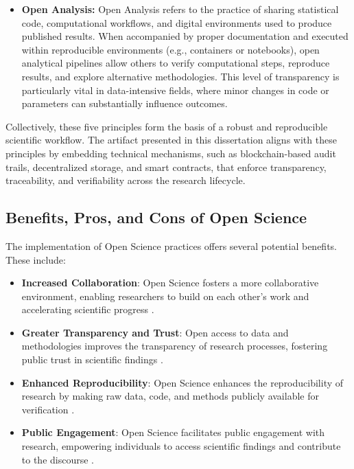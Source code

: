 \documentclass[final]{rc-book-2.14}
\begin{document}
\begin{itemize}
    \item \textbf{Open Analysis:} Open Analysis refers to the practice of sharing statistical code, computational workflows, and digital environments used to produce published results. When accompanied by proper documentation and executed within reproducible environments (e.g., containers or notebooks), open analytical pipelines allow others to verify computational steps, reproduce results, and explore alternative methodologies. This level of transparency is particularly vital in data-intensive fields, where minor changes in code or parameters can substantially influence outcomes.

\end{itemize}

Collectively, these five principles form the basis of a robust and reproducible scientific workflow. The artifact presented in this dissertation aligns with these principles by embedding technical mechanisms, such as blockchain-based audit trails, decentralized storage, and smart contracts, that enforce transparency, traceability, and verifiability across the research lifecycle.


\subsection{Benefits, Pros, and Cons of Open Science}

The implementation of Open Science practices offers several potential benefits. These include:

\begin{itemize}
    \item \textbf{Increased Collaboration}: Open Science fosters a more collaborative environment, enabling researchers to build on each other's work and accelerating scientific progress \cite{Borgman2012}.
    \item \textbf{Greater Transparency and Trust}: Open access to data and methodologies improves the transparency of research processes, fostering public trust in scientific findings \cite{Boulton2015}.
    \item \textbf{Enhanced Reproducibility}: Open Science enhances the reproducibility of research by making raw data, code, and methods publicly available for verification \cite{Nosek2015}.
    \item \textbf{Public Engagement}: Open Science facilitates public engagement with research, empowering individuals to access scientific findings and contribute to the discourse \cite{Leonelli2016}.
\end{itemize}
\end{document}
